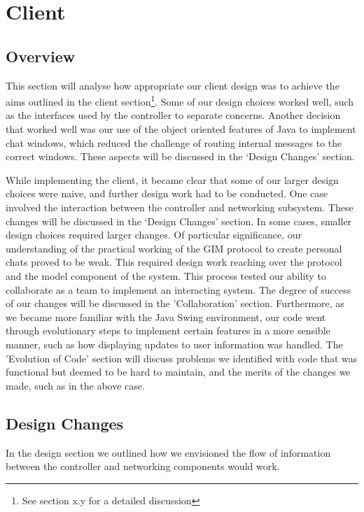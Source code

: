 \section{Client}

\subsection{Overview}

This section will analyse how appropriate our client design was to achieve the aims outlined in the client section\footnote{See section x.y for a detailed discussion}. Some of our design choices worked well, such as the interfaces used by the controller to separate concerns. Another decision that worked well was our use of the object oriented features of Java to implement chat windows, which reduced the challenge of routing internal messages to the correct windows. These aspects will be discussed in the `Design Changes' section.

While implementing the client, it became clear that some of our larger design choices were naive, and further design work had to be conducted. One case involved the interaction between the controller and networking subsystem. These changes will be discussed in the `Design Changes' section. In some cases, smaller design choices required larger changes. Of particular significance, our understanding of the practical working of the GIM protocol to create personal chats proved to be weak. This required design work reaching over the protocol and the model component of the system. This process tested our ability to collaborate as a team to implement an interacting system. The degree of success of our changes will be discussed in the 'Collaboration' section. Furthermore, as we became more familiar with the Java Swing environment, our code went through evolutionary steps to implement certain features in a more sensible manner, such as how displaying updates to user information was handled. The 'Evolution of Code' section will discuss problems we identified with code that was functional but deemed to be hard to maintain, and the merits of the changes we made, such as in the above case. 

\subsection{Design Changes}

In the design section we outlined how we envisioned the flow of information between the controller and networking components would work. 

